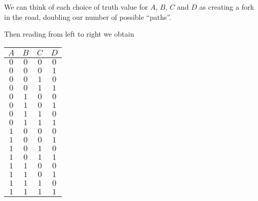 \begin{solutions}
	We can think of each choice of truth value for $A$, $B$, $C$ and $D$ as creating a fork in the road, doubling our number of possible ``paths''.
	
	\begin{center}
	\end{center}
	
	Then reading from left to right we obtain
	
	\begin{table}[h!]
		\begin{center}
			\begin{tabular}{c|c|c|c} 
				$A$ & $B$ & $C$  & $D$ \\
				\hline
				$0$ & $0$ & $0$  & $0$ \\ \hline
				$0$ & $0$ & $0$  & $1$ \\ \hline
				$0$ & $0$ & $1$  & $0$ \\ \hline
				$0$ & $0$ & $1$  & $1$ \\ \hline
				$0$ & $1$ & $0$  & $0$ \\ \hline
				$0$ & $1$ & $0$  & $1$ \\ \hline
				$0$ & $1$ & $1$  & $0$ \\ \hline
				$0$ & $1$ & $1$  & $1$ \\ \hline
				$1$ & $0$ & $0$  & $0$ \\ \hline
				$1$ & $0$ & $0$  & $1$ \\ \hline
				$1$ & $0$ & $1$  & $0$ \\ \hline
				$1$ & $0$ & $1$  & $1$ \\ \hline
				$1$ & $1$ & $0$  & $0$ \\ \hline
				$1$ & $1$ & $0$  & $1$ \\ \hline
				$1$ & $1$ & $1$  & $0$ \\ \hline
				$1$ & $1$ & $1$  & $1$ \\ 
			\end{tabular}
		\end{center}
	\end{table}
	
\end{solutions}

